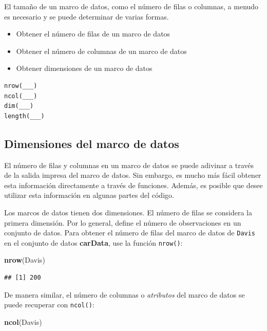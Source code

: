 \documentclass[
]{book}
\newenvironment{Shaded}{\begin{snugshade}}{\end{snugshade}}
\newcommand{\KeywordTok}[1]{\textcolor[rgb]{0.13,0.29,0.53}{\textbf{#1}}}
\newcommand{\NormalTok}[1]{#1}
\providecommand{\tightlist}{%
  \setlength{\itemsep}{0pt}\setlength{\parskip}{0pt}}
\begin{document}
El tamaño de un marco de datos, como el número de filas o columnas, a menudo es necesario y se puede determinar de varias formas.

\begin{itemize}
\tightlist
\item
  Obtener el número de filas de un marco de datos
\item
  Obtener el número de columnas de un marco de datos
\item
  Obtener dimensiones de un marco de datos
\end{itemize}

\begin{verbatim}
nrow(___)
ncol(___)
dim(___)
length(___)
\end{verbatim}

\hypertarget{dimensiones-del-marco-de-datos}{%
\subsection{Dimensiones del marco de datos}\label{dimensiones-del-marco-de-datos}}

El número de filas y columnas en un marco de datos se puede adivinar a través de la salida impresa del marco de datos. Sin embargo, es mucho más fácil obtener esta información directamente a través de funciones. Además, es posible que desee utilizar esta información en algunas partes del código.

Los marcos de datos tienen dos dimensiones. El número de filas se considera la primera dimensión. Por lo general, define el número de observaciones en un conjunto de datos. Para obtener el número de filas del marco de datos de \texttt{Davis} en el conjunto de datos \textbf{carData}, use la función \texttt{nrow()}:

\begin{Shaded}
\begin{Highlighting}[]
\KeywordTok{nrow}\NormalTok{(Davis)}
\end{Highlighting}
\end{Shaded}

\begin{verbatim}
## [1] 200
\end{verbatim}

De manera similar, el número de columnas o \emph{atributos} del marco de datos se puede recuperar con \texttt{ncol()}:

\begin{Shaded}
\begin{Highlighting}[]
\KeywordTok{ncol}\NormalTok{(Davis)}
\end{Highlighting}
\end{Shaded}
\end{document}
